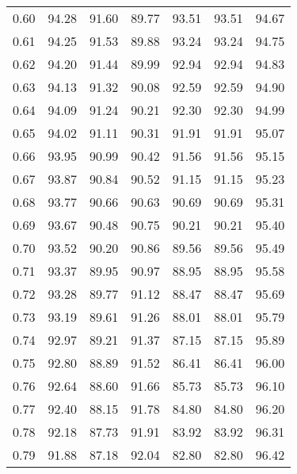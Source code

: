 \begin{tabular}{|c|c|c|c|c|c|c|}
      0.60 &     94.28 &     91.60 &      89.77 &   93.51 &      93.51 &         94.67 \\
      0.61 &     94.25 &     91.53 &      89.88 &   93.24 &      93.24 &         94.75 \\
      0.62 &     94.20 &     91.44 &      89.99 &   92.94 &      92.94 &         94.83 \\
      0.63 &     94.13 &     91.32 &      90.08 &   92.59 &      92.59 &         94.90 \\
      0.64 &     94.09 &     91.24 &      90.21 &   92.30 &      92.30 &         94.99 \\
      0.65 &     94.02 &     91.11 &      90.31 &   91.91 &      91.91 &         95.07 \\
      0.66 &     93.95 &     90.99 &      90.42 &   91.56 &      91.56 &         95.15 \\
      0.67 &     93.87 &     90.84 &      90.52 &   91.15 &      91.15 &         95.23 \\
      0.68 &     93.77 &     90.66 &      90.63 &   90.69 &      90.69 &         95.31 \\
      0.69 &     93.67 &     90.48 &      90.75 &   90.21 &      90.21 &         95.40 \\
      0.70 &     93.52 &     90.20 &      90.86 &   89.56 &      89.56 &         95.49 \\
      0.71 &     93.37 &     89.95 &      90.97 &   88.95 &      88.95 &         95.58 \\
      0.72 &     93.28 &     89.77 &      91.12 &   88.47 &      88.47 &         95.69 \\
      0.73 &     93.19 &     89.61 &      91.26 &   88.01 &      88.01 &         95.79 \\
      0.74 &     92.97 &     89.21 &      91.37 &   87.15 &      87.15 &         95.89 \\
      0.75 &     92.80 &     88.89 &      91.52 &   86.41 &      86.41 &         96.00 \\
      0.76 &     92.64 &     88.60 &      91.66 &   85.73 &      85.73 &         96.10 \\
      0.77 &     92.40 &     88.15 &      91.78 &   84.80 &      84.80 &         96.20 \\
      0.78 &     92.18 &     87.73 &      91.91 &   83.92 &      83.92 &         96.31 \\
      0.79 &     91.88 &     87.18 &      92.04 &   82.80 &      82.80 &         96.42 \\

\end{tabular}
